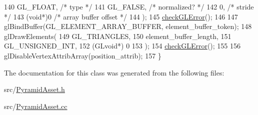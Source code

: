 \begin{DoxyCode}
140     GL\_FLOAT,   \textcolor{comment}{/* type */}
141     GL\_FALSE,   \textcolor{comment}{/* normalized? */}
142     0,        \textcolor{comment}{/* stride */}
143     (\textcolor{keywordtype}{void}*)0    \textcolor{comment}{/* array buffer offset */}
144   );
145   \hyperlink{PyramidAsset_8cc_a75f201b0e53e68726854997957322b8d}{checkGLError}();
146 
147   glBindBuffer(GL\_ELEMENT\_ARRAY\_BUFFER, element\_buffer\_token);
148   glDrawElements(
149     GL\_TRIANGLES,
150     element\_buffer\_length,
151     GL\_UNSIGNED\_INT,
152     (GLvoid*) 0
153   );
154   \hyperlink{PyramidAsset_8cc_a75f201b0e53e68726854997957322b8d}{checkGLError}();
155 
156   glDisableVertexAttribArray(position\_attrib);
157 \}
\end{DoxyCode}


The documentation for this class was generated from the following files\+:\begin{DoxyCompactItemize}
\item 
src/\hyperlink{PyramidAsset_8h}{Pyramid\+Asset.\+h}\item 
src/\hyperlink{PyramidAsset_8cc}{Pyramid\+Asset.\+cc}\end{DoxyCompactItemize}
